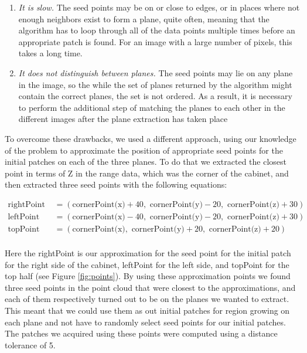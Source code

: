 \begin{enumerate}
	\item \emph{It is slow.} The seed points may be on or close to edges, or in places where not enough neighbors exist to form a plane, quite often, meaning that the algorithm has to loop through all of the data points multiple times before an appropriate patch is found. For an image with a large number of pixels, this takes a long time.
	\item \emph{It does not distinguish between planes.} The seed points may lie on any plane in the image, so the while the set of planes returned by the algorithm might contain the correct planes, the set is not ordered. As a result, it is necessary to perform the additional step of matching the planes to each other in the different images after the plane extraction has taken place
\end{enumerate}

To overcome these drawbacks, we used a different approach, using our knowledge of the problem to approximate the position of appropriate seed points for the initial patches on each of the three planes. To do that we extracted the closest point in terms of Z in the range data, which was the corner of the cabinet, and then extracted three seed points with the following equations:

\begin{equation*}
	\begin{split}
	\text{rightPoint } &= (\text{cornerPoint(x)} + 40, \text{ cornerPoint(y)} - 20, \text{ cornerPoint(z)} + 30) \\
	\text{leftPoint } &= (\text{cornerPoint(x)} - 40, \text{ cornerPoint(y)} - 20, \text{ cornerPoint(z)} + 30) \\
	\text{topPoint } &= (\text{cornerPoint(x)}, \text{ cornerPoint(y)} + 20, \text{ cornerPoint(z)} + 20) \\
	\end{split}
\end{equation*}

Here the rightPoint is our approximation for the seed point for the initial patch for the right side of the cabinet, leftPoint for the left side, and topPoint for the top half (see Figure \ref{fig:points}). By using these approximation points we found three seed points in the point cloud that were closest to the approximations, and each of them respectively turned out to be on the planes we wanted to extract. This meant that we could use them as out initial patches for region growing on each plane and not have to randomly select seed points for our initial patches. The patches we acquired using these points were computed using a distance tolerance of 5.

